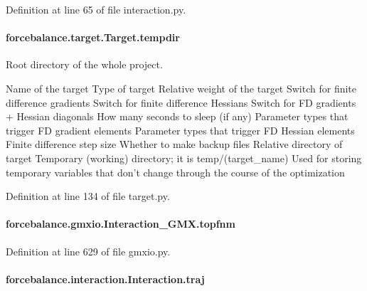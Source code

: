 Definition at line 65 of file interaction.\-py.

\hypertarget{classforcebalance_1_1target_1_1Target_aa1f01b5b78db253b5b66384ed11ed193}{
\paragraph[{tempdir}]{\setlength{\rightskip}{0pt plus 5cm}forcebalance.\-target.\-Target.\-tempdir\hspace{0.3cm}{\ttfamily [inherited]}}}\label{classforcebalance_1_1target_1_1Target_aa1f01b5b78db253b5b66384ed11ed193}


Root directory of the whole project. 

Name of the target Type of target Relative weight of the target Switch for finite difference gradients Switch for finite difference Hessians Switch for F\-D gradients + Hessian diagonals How many seconds to sleep (if any) Parameter types that trigger F\-D gradient elements Parameter types that trigger F\-D Hessian elements Finite difference step size Whether to make backup files Relative directory of target Temporary (working) directory; it is temp/(target\-\_\-name) Used for storing temporary variables that don't change through the course of the optimization 

Definition at line 134 of file target.\-py.

\hypertarget{classforcebalance_1_1gmxio_1_1Interaction__GMX_a8d43d5b83c331a64f7c97253ce64a9c8}{
\paragraph[{topfnm}]{\setlength{\rightskip}{0pt plus 5cm}forcebalance.\-gmxio.\-Interaction\-\_\-\-G\-M\-X.\-topfnm}}\label{classforcebalance_1_1gmxio_1_1Interaction__GMX_a8d43d5b83c331a64f7c97253ce64a9c8}


Definition at line 629 of file gmxio.\-py.

\hypertarget{classforcebalance_1_1interaction_1_1Interaction_af838808df9bf58ead305d079ccf21f8a}{
\paragraph[{traj}]{\setlength{\rightskip}{0pt plus 5cm}forcebalance.\-interaction.\-Interaction.\-traj\hspace{0.3cm}{\ttfamily [inherited]}}}\label{classforcebalance_1_1interaction_1_1Interaction_af838808df9bf58ead305d079ccf21f8a}


